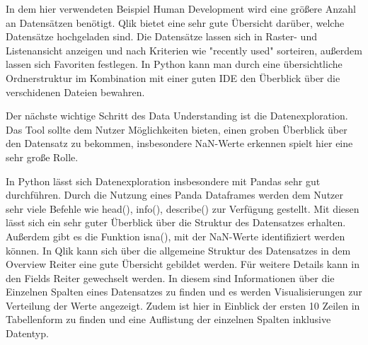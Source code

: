 \documentclass[12pt]{article}
\begin{document}
	In dem hier verwendeten Beispiel Human Development wird eine größere Anzahl an Datensätzen benötigt. Qlik bietet eine sehr gute Übersicht darüber, welche Datensätze hochgeladen sind. Die Datensätze lassen sich in Raster- und Listenansicht anzeigen und nach Kriterien wie "recently used" sorteiren, außerdem lassen sich Favoriten festlegen. In Python kann man durch eine übersichtliche Ordnerstruktur im Kombination mit einer guten IDE den Überblick über die verschidenen Dateien bewahren.
	
	Der nächste wichtige Schritt des Data Understanding ist die Datenexploration. Das Tool sollte dem Nutzer Möglichkeiten bieten, einen groben Überblick über den Datensatz zu bekommen, insbesondere NaN-Werte erkennen spielt hier eine sehr große Rolle.
	
	In Python lässt sich Datenexploration insbesondere mit Pandas sehr gut durchführen. Durch die Nutzung eines Panda Dataframes werden dem Nutzer sehr viele Befehle wie head(), info(), describe() zur Verfügung gestellt. Mit diesen lässt sich ein sehr guter Überblick über die Struktur des Datensatzes erhalten. Außerdem gibt es die Funktion isna(), mit der NaN-Werte identifiziert werden können.	
	In Qlik kann sich über die allgemeine Struktur des Datensatzes in dem Overview Reiter eine gute Übersicht gebildet werden. Für weitere Details kann in den Fields Reiter gewechselt werden. In diesem sind Informationen über die Einzelnen Spalten eines Datensatzes zu finden und es werden Visualisierungen zur Verteilung der Werte angezeigt. Zudem ist hier in Einblick der ersten 10 Zeilen in Tabellenform zu finden und eine Auflistung der einzelnen Spalten inklusive Datentyp.
	
\end{document}
